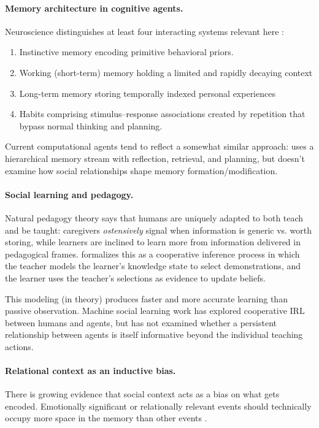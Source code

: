 \documentclass[11pt]{article}
\begin{document}
\paragraph{Memory architecture in cognitive agents.}
 Neuroscience distinguishes at least four interacting systems relevant here \citep{tulving1985memory}: 
 \begin{enumerate}
     \item Instinctive memory encoding primitive behavioral priors.
     \item Working (short-term) memory holding a limited and rapidly decaying context
     \item Long-term memory storing temporally indexed personal experiences
     \item Habits comprising stimulus--response associations created by repetition that bypass normal thinking and planning. 
 \end{enumerate}
 
 Current computational agents tend to reflect a somewhat similar approach: \citet{park2023generative} uses a hierarchical memory stream with reflection, retrieval, and planning, but doesn't examine how social relationships shape memory formation/modification.

\paragraph{Social learning and pedagogy.}
Natural pedagogy theory \citep{csibra2009natural} says that humans are uniquely adapted to both teach and be taught: caregivers \emph{ostensively} signal when information is generic vs. worth storing, while learners are inclined to learn more from information delivered in pedagogical frames. \citet{gweon2021inferential} formalizes this as a cooperative inference process in which the teacher models the learner's knowledge state to select demonstrations, and the learner uses the teacher's selections as evidence to update beliefs.

This modeling (in theory) produces faster and more accurate learning than passive observation. Machine social learning work \citep{ho2019cooperative} has explored cooperative IRL between humans and agents, but has not examined whether a persistent relationship between agents is itself informative beyond the individual teaching actions.

\paragraph{Relational context as an inductive bias.}
There is growing evidence that social context acts as a bias on what gets encoded. Emotionally significant or relationally relevant events should technically occupy more space in the memory than other events \citep{dolcos2004interaction}. 
\end{document}
